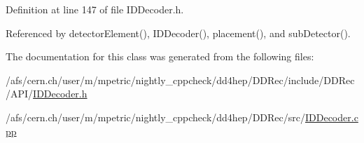 Definition at line 147 of file IDDecoder.h.

Referenced by detectorElement(), IDDecoder(), placement(), and subDetector().

The documentation for this class was generated from the following files:\begin{DoxyCompactItemize}
\item 
/afs/cern.ch/user/m/mpetric/nightly\_\-cppcheck/dd4hep/DDRec/include/DDRec/API/\hyperlink{_i_d_decoder_8h}{IDDecoder.h}\item 
/afs/cern.ch/user/m/mpetric/nightly\_\-cppcheck/dd4hep/DDRec/src/\hyperlink{_i_d_decoder_8cpp}{IDDecoder.cpp}\end{DoxyCompactItemize}
